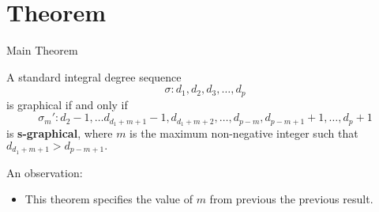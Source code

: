 \section{Theorem}

\begin{frame}{Main Theorem}
	\begin{theorem}
		A standard integral degree sequence 
		\begin{equation}
			\sigma: d_1,d_2,d_3,\ldots, d_p
		\end{equation}
		is graphical if and only if 
		\begin{equation*}
			\sigma_m':d_2-1,\ldots d_{d_1+m+1}-1,d_{d_1+m+2},\ldots, d_{p-m},d_{p-m+1}+1,\ldots,d_p+1
		\end{equation*}
		is \textbf{s-graphical}, where $m$ is the maximum non-negative integer such that $d_{d_1+m+1}>d_{p-m+1}.$
	\end{theorem}
		An observation:
	\begin{itemize}
		\item This theorem specifies the value of $m$ from previous the previous result.
	\end{itemize}
\end{frame}
